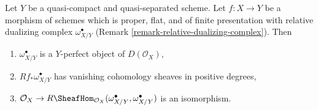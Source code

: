 %
\begin{lemma}
\label{lemma-properties-relative-dualizing}
Let $Y$ be a quasi-compact and quasi-separated scheme.
Let $f : X \to Y$ be a morphism of schemes which is
proper, flat, and of finite presentation with
relative dualizing complex $\omega_{X/Y}^\bullet$
(Remark \ref{remark-relative-dualizing-complex}).
Then
\begin{enumerate}
\item $\omega_{X/Y}^\bullet$ is a $Y$-perfect object of $D(\mathcal{O}_X)$,
\item $Rf_*\omega_{X/Y}^\bullet$ has vanishing cohomology sheaves
in positive degrees,
\item $\mathcal{O}_X \to
R\SheafHom_{\mathcal{O}_X}(\omega_{X/Y}^\bullet, \omega_{X/Y}^\bullet)$
is an isomorphism.
\end{enumerate}
\end{lemma}

